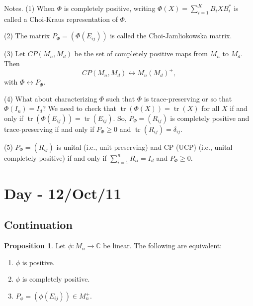\documentclass[12pt]{article}
\theoremstyle{definition}
\newtheorem*{proposition}{Proposition}
\DeclareMathOperator{\tr}{tr}
\newcommand{\C}{\mathbb{C}}
\begin{document}
Notes. (1) When $\Phi$ is completely positive, writing $\Phi(X)=\sum_{i=1}^K B_iXB_i^*$ is called a Choi-Kraus representation of $\Phi$.

(2) The matrix $P_\Phi=(\Phi(E_{ij}))$ is called the Choi-Jamliokowska matrix.

(3) Let $CP(M_n,M_d)$ be the set of completely positive maps from $M_n$ to $M_d$. Then
\[
CP(M_n,M_d) \leftrightarrow M_n(M_d)^+,
\]
with $\Phi \leftrightarrow P_\Phi$.

(4) What about characterizing $\Phi$ such that $\Phi$ is trace-preserving or so that $\Phi(I_n)=I_d$? We need to check that $\tr(\Phi(X))=\tr(X)$ for all $X$ if and only if $\tr(\Phi(E_{ij}))=\tr(E_{ij})$. So, $P_\Phi=(R_{ij})$ is completely positive and trace-preserving if and only if $P_\Phi \geq 0$ and $\tr(R_{ij})=\delta_{ij}$.

(5) $P_\Phi=(R_{ij})$ is unital (i.e., unit preserving) and CP (UCP) (i.e., unital completely positive) if and only if $\sum_{i=1}^n R_{ii}=I_d$ and $P_\Phi \geq 0$.

\section{Day - 12/Oct/11}

\subsection{Continuation}

\begin{proposition}
Let $\phi:M_n \to \C$ be linear. The following are equivalent:
\begin{enumerate}
\item $\phi$ is positive.
\item $\phi$ is completely positive.
\item $P_\phi=(\phi(E_{ij})) \in M_n^+$.
\end{enumerate}
\end{proposition}
\end{document}
